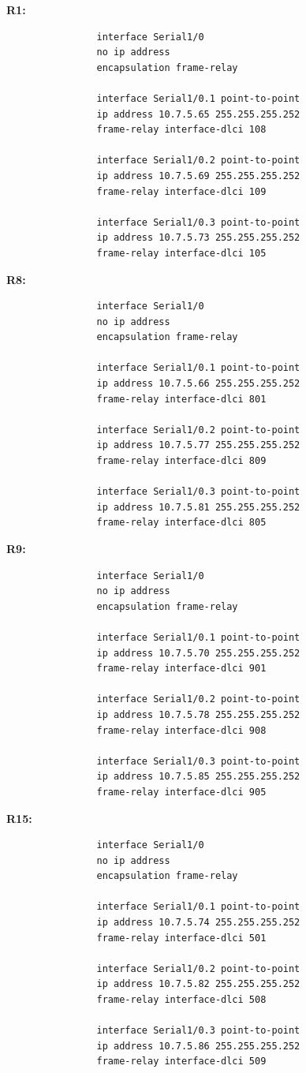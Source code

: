 			\textbf{R1:}
			\begin{verbatim}
				interface Serial1/0
				no ip address
				encapsulation frame-relay
				
				interface Serial1/0.1 point-to-point
				ip address 10.7.5.65 255.255.255.252
				frame-relay interface-dlci 108

				interface Serial1/0.2 point-to-point
				ip address 10.7.5.69 255.255.255.252
				frame-relay interface-dlci 109

				interface Serial1/0.3 point-to-point
				ip address 10.7.5.73 255.255.255.252
				frame-relay interface-dlci 105
			\end{verbatim}	

			\vspace{0.5cm}
			\textbf{R8:}
			\begin{verbatim}
				interface Serial1/0
				no ip address
				encapsulation frame-relay

				interface Serial1/0.1 point-to-point
				ip address 10.7.5.66 255.255.255.252
				frame-relay interface-dlci 801

				interface Serial1/0.2 point-to-point
				ip address 10.7.5.77 255.255.255.252
				frame-relay interface-dlci 809

				interface Serial1/0.3 point-to-point
				ip address 10.7.5.81 255.255.255.252
				frame-relay interface-dlci 805
			\end{verbatim}	
			
			\vspace{0.5cm}
			\textbf{R9:}
			\begin{verbatim}
				interface Serial1/0
				no ip address
				encapsulation frame-relay

				interface Serial1/0.1 point-to-point
				ip address 10.7.5.70 255.255.255.252
				frame-relay interface-dlci 901

				interface Serial1/0.2 point-to-point
				ip address 10.7.5.78 255.255.255.252
				frame-relay interface-dlci 908

				interface Serial1/0.3 point-to-point
				ip address 10.7.5.85 255.255.255.252
				frame-relay interface-dlci 905
			\end{verbatim}	

			\vspace{0.5cm}
			\textbf{R15:}
			\begin{verbatim}
				interface Serial1/0
				no ip address
				encapsulation frame-relay

				interface Serial1/0.1 point-to-point
				ip address 10.7.5.74 255.255.255.252
				frame-relay interface-dlci 501

				interface Serial1/0.2 point-to-point
				ip address 10.7.5.82 255.255.255.252
				frame-relay interface-dlci 508

				interface Serial1/0.3 point-to-point
				ip address 10.7.5.86 255.255.255.252
				frame-relay interface-dlci 509
			\end{verbatim}
	

